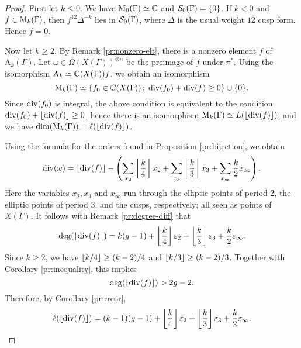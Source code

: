 \begin{proof}
 First let $k\leq 0$. We have $\mathrm{M}_0(\Gamma)\simeq\mathbb{C}$ and $\mathcal{S}_0(\Gamma)=\{0\}$. If $k<0$ and $f\in\mathrm{M}_{k}(\Gamma)$, then $f^{12}\Delta^{-k}$ lies in $\mathcal{S}_0(\Gamma)$, where $\Delta$ is the usual weight $12$ cusp form. Hence $f=0$.
 
 Now let $k\geq 2$. By Remark \ref{pr:nonzero-elt}, there is a nonzero element $f$ of $\mathrm{A}_k(\Gamma)$. Let $\omega\in\Omega(X(\Gamma))^{\otimes n}$ be the preimage of $f$ under $\pi^*$. Using the isomorphism $\mathrm{A}_k\simeq\mathbb{C}(X(\Gamma))f$, we obtain an isomorphism
 \[
 \mathrm{M}_k(\Gamma)\simeq\{f_0\in\mathbb{C}(X(\Gamma))\,;\; \operatorname{div}(f_0)+\operatorname{div}(f)\geq 0\} \cup \{0\}.
 \]
 Since $\operatorname{div}(f_0)$ is integral, the above condition is equivalent to the condition $\operatorname{div}(f_0)+\left \lfloor \operatorname{div}(f) \right\rfloor\geq 0$, hence there is an isomorphism $\mathrm{M}_{k}(\Gamma)\simeq L(\left \lfloor \operatorname{div}(f) \right\rfloor)$, and we have $\dim(\mathrm{M}_k(\Gamma))=\ell(\left \lfloor \operatorname{div}(f) \right\rfloor)$.
 
 Using the formula for the orders found in Proposition \ref{pr:bijection}, we obtain
 \[
  \operatorname{div}(\omega)=\left \lfloor \operatorname{div}(f) \right\rfloor-\left(\sum_{x_2}\left \lfloor \frac{k}{4} \right\rfloor x_{2}+\sum_{x_{3}}\left \lfloor \frac{k}{3} \right\rfloor x_3+\sum_{x_{\infty}}\frac{k}{2}x_{\infty}\right).
 \]
 Here the variables $x_2, x_3$ and $x_\infty$ run through the elliptic points of period $2$, the elliptic points of period $3$, and the cusps, respectively; all seen as points of $X(\Gamma)$. It follows with Remark \ref{pr:degree-diff} that
 \[
  \deg(\left \lfloor \operatorname{div}(f) \right\rfloor)=k(g-1) + \left \lfloor \frac{k}{4} \right\rfloor\varepsilon_2 + \left \lfloor \frac{k}{3} \right\rfloor\varepsilon_3 + \frac{k}{2}\varepsilon_\infty.
 \]
 Since $k\geq 2$, we have $\left \lfloor k/4 \right\rfloor\geq(k-2)/4$ and $\left \lfloor k/3 \right\rfloor\geq(k-2)/3$. Together with Corollary \ref{pr:inequality}, this implies
 \[
  \deg(\left \lfloor \operatorname{div}(f) \right\rfloor)>2g-2.
 \]
 Therefore, by Corollary \ref{pr:rrcor},
 \[
  \ell(\left \lfloor \operatorname{div}(f) \right\rfloor)=(k-1)(g-1) + \left \lfloor \frac{k}{4} \right\rfloor\varepsilon_2 + \left \lfloor \frac{k}{3} \right\rfloor\varepsilon_3 + \frac{k}{2}\varepsilon_\infty.
 \]
 
\end{proof}

